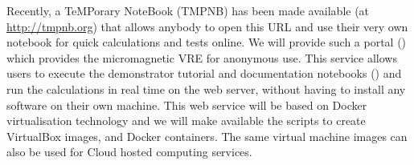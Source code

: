 \begin{workpackage}
\begin{tasklist}
\begin{task}[lead=USO,title=Demonstrator: micromagnetic VRE notebooks,
  id=oommf-tutorial-and-documentation,PM=6,partners={SR,PS},wphases=15-21]

\end{task}

\begin{task}[lead=USO,id=oommf-nb-ve,title=Online portal for
  micromagnetic VRE demonstrator,PM=3,partners={SR,JU},wphases=21-24]

  Recently, a TeMPorary \Jupyter NoteBook (TMPNB) has been made
  available (at \href{http://tmpnb.org}{http://tmpnb.org}) that allows
  anybody to open this URL and use their very own \Jupyter notebook
  for quick calculations and tests online. We will provide such a
  portal () which provides the micromagnetic VRE for anonymous use. This
  service allows users to execute the demonstrator tutorial and
  documentation notebooks
  () and run the
  calculations in real time on the web server, without having to
  install any software on their own machine.  This web service will be
  based on Docker \cite{Docker} virtualisation technology and we will
  make available the scripts to create VirtualBox \cite{Virtualbox}
  images, and Docker containers. The same virtual machine images can
  also be used for Cloud hosted computing services.


\end{task}
\end{tasklist}
\end{workpackage}
